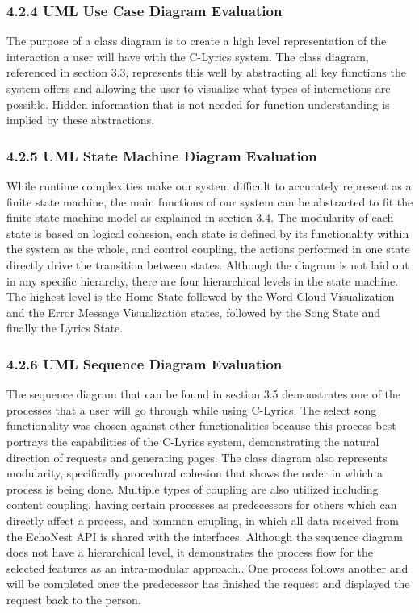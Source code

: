 \documentclass[]{article}
\begin{document}
\subsubsection{4.2.4 UML Use Case Diagram
Evaluation}\label{uml-use-case-diagram-evaluation}

The purpose of a class diagram is to create a high level representation
of the interaction a user will have with the C-Lyrics system. The class
diagram, referenced in section 3.3, represents this well by abstracting
all key functions the system offers and allowing the user to visualize
what types of interactions are possible. Hidden information that is not
needed for function understanding is implied by these abstractions.

\subsubsection{4.2.5 UML State Machine Diagram
Evaluation}\label{uml-state-machine-diagram-evaluation}

While runtime complexities make our system difficult to accurately
represent as a finite state machine, the main functions of our system
can be abstracted to fit the finite state machine model as explained in
section 3.4. The modularity of each state is based on logical cohesion,
each state is defined by its functionality within the system as the
whole, and control coupling, the actions performed in one state directly
drive the transition between states. Although the diagram is not laid
out in any specific hierarchy, there are four hierarchical levels in the
state machine. The highest level is the Home State followed by the Word
Cloud Visualization and the Error Message Visualization states, followed
by the Song State and finally the Lyrics State.

\subsubsection{4.2.6 UML Sequence Diagram
Evaluation}\label{uml-sequence-diagram-evaluation}

The sequence diagram that can be found in section 3.5 demonstrates one
of the processes that a user will go through while using C-Lyrics. The
select song functionality was chosen against other functionalities
because this process best portrays the capabilities of the C-Lyrics
system, demonstrating the natural direction of requests and generating
pages. The class diagram also represents modularity, specifically
procedural cohesion that shows the order in which a process is being
done. Multiple types of coupling are also utilized including content
coupling, having certain processes as predecessors for others which can
directly affect a process, and common coupling, in which all data
received from the EchoNest API is shared with the interfaces. Although
the sequence diagram does not have a hierarchical level, it demonstrates
the process flow for the selected features as an intra-modular
approach.. One process follows another and will be completed once the
predecessor has finished the request and displayed the request back to
the person.
\end{document}
